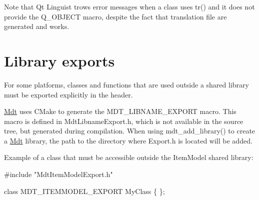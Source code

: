 Note that Qt Linguist trows error messages when a class uses tr() and it does not provide the Q\+\_\+\+O\+B\+J\+E\+CT macro, despite the fact that translation file are generated and works.\hypertarget{guideline_page_library_exports}{}\section{Library exports}\label{guideline_page_library_exports}
For some platforms, classes and functions that are used outside a shared library must be exported explicitly in the header.

\hyperlink{namespace_mdt}{Mdt} uses C\+Make to generate the M\+D\+T\+\_\+\+L\+I\+B\+N\+A\+M\+E\+\_\+\+E\+X\+P\+O\+RT macro. This macro is defined in Mdt\+Libname\+Export.\+h, which is not available in the source tree, but generated during compilation. When using mdt\+\_\+add\+\_\+library() to create a \hyperlink{namespace_mdt}{Mdt} library, the path to the directory where Export.\+h is located will be added.

Example of a class that must be accessible outside the Item\+Model shared library\+: 
\begin{DoxyCode}
\textcolor{preprocessor}{#include "MdtItemModelExport.h"}

\textcolor{keyword}{class }MDT\_ITEMMODEL\_EXPORT MyClass
\{
\};
\end{DoxyCode}
 